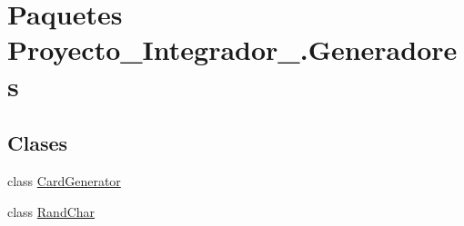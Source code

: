 \hypertarget{namespace_proyecto___integrador__3_1_1_generadores}{\section{Paquetes Proyecto\-\_\-\-Integrador\-\_.\-Generadores}
\label{namespace_proyecto___integrador__3_1_1_generadores}
}
\subsection*{Clases}
\begin{DoxyCompactItemize}
\item 
class \hyperlink{class_proyecto___integrador__3_1_1_generadores_1_1_card_generator}{Card\-Generator}
\item 
class \hyperlink{class_proyecto___integrador__3_1_1_generadores_1_1_rand_char}{Rand\-Char}
\end{DoxyCompactItemize}
